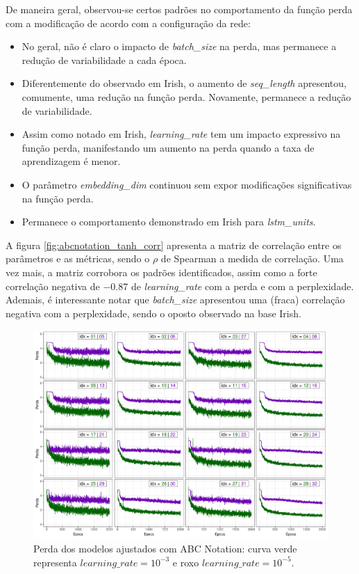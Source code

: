 \documentclass[twoside]{automatextcc}
\begin{document}
De maneira geral, observou-se certos padrões no comportamento da função perda com a modificação de acordo com a configuração da rede:
\begin{itemize}
    \item No geral, não é claro o impacto de \textit{batch\_size} na perda, mas permanece a redução de variabilidade a cada época.
    \item Diferentemente do observado em Irish, o aumento de \textit{seq\_length} apresentou, comumente, uma redução na função perda. Novamente, permanece a redução de variabilidade.
    \item Assim como notado em Irish, \textit{learning\_rate} tem um impacto expressivo na função perda, manifestando um aumento na perda quando a taxa de aprendizagem é menor. 
    \item O parâmetro \textit{embedding\_dim} continuou sem expor modificações significativas na função perda.
    \item Permanece o comportamento demonstrado em Irish para \textit{lstm\_units}. 
\end{itemize}
A figura \ref{fig:abcnotation_tanh_corr} apresenta a matriz de correlação entre os parâmetros e as métricas, sendo o $\rho$ de Spearman a medida de correlação. Uma vez mais, a matriz corrobora os padrões identificados, assim como a forte correlação negativa de $-0.87$ de \textit{learning\_rate} com a perda e com a perplexidade. Ademais, é interessante notar que \textit{batch\_size} apresentou uma (fraca) correlação negativa com a perplexidade, sendo o oposto observado na base Irish.

\begin{figure}[!ht]
    \centering
    \includegraphics[width=\textwidth]{abcnotation_tanh_loss.pdf}
    \caption{Perda dos modelos ajustados com ABC Notation: curva verde representa $learning\_rate = 10^{-3}$ e roxo $learning\_rate = 10^{-5}$.}
    \label{fig:abcnotation_tanh_loss}
\end{figure}
\end{document}
